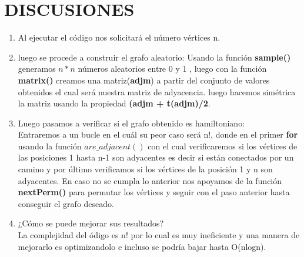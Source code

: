 \documentclass[journal]{IEEEtran}
\begin{document}
\section{\Large{\bf DISCUSIONES}}
\begin{enumerate}
	\item Al ejecutar el c{\'o}digo nos solicitar{\'a} el n{\'u}mero v{\'e}rtices n.
	\item luego se procede a construir el grafo aleatorio:
	Usando la funci{\'o}n \textbf{sample()} generamos $n*n$ n{\'u}meros aleatorios entre 0 y 1 , luego con la funci{\'o}n \textbf{matrix()} creamos una matriz(\textbf{adjm}) a partir del conjunto de valores obtenidos el cual ser{\'a} nuestra matriz de adyacencia. luego hacemos sim{\'e}trica la matriz usando la propiedad \textbf{(adjm + t(adjm)/2}.
	\item Luego pasamos a verificar si el grafo obtenido es hamiltoniano:\\
	Entraremos a un bucle en el cu{\'a}l su peor caso será n!, donde en el primer \textbf{for} usando la funci{\'o}n \textbf{$are\_adjacent()$} con el cual verificaremos si los v{\'e}rtices de las posiciones 1 hasta n-1 son adyacentes es decir si est{\'a}n conectados por un camino y por {\'u}ltimo verificamos si los v{\'e}rtices de la posici{\'o}n 1 y n son adyacentes. En caso no se cumpla lo anterior nos apoyamos de la funci{\'o}n \textbf{nextPerm()}  para permutar los v{\'e}rtices y seguir con el paso anterior hasta conseguir el grafo deseado.
	
	\item ¿C{\'o}mo se puede mejorar sus resultados?\\
	La complejidad del {\'o}digo es n! por lo cual es muy ineficiente y una manera de mejorarlo es optimizandolo e incluso se podría bajar hasta O(nlogn).
\end{enumerate}
\end{document}
